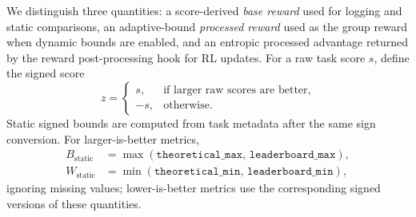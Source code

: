 We distinguish three quantities: a score-derived \emph{base reward} used for logging and static comparisons, an adaptive-bound \emph{processed reward} used as the group reward when dynamic bounds are enabled, and an entropic processed advantage returned by the reward post-processing hook for RL updates.
For a raw task score $s$, define the signed score
\begin{equation}
\label{eq:signscore}
z =
\begin{cases}
s, & \text{if larger raw scores are better},\\
-s, & \text{otherwise}.
\end{cases}
\end{equation}
Static signed bounds are computed from task metadata after the same sign conversion. For larger-is-better metrics,
\begin{equation}
\label{eq:metric}
\begin{aligned}
B_{\mathrm{static}} &= \max(\texttt{theoretical\_max},\, \texttt{leaderboard\_max}), \\
W_{\mathrm{static}} &= \min(\texttt{theoretical\_min},\, \texttt{leaderboard\_min}),
\end{aligned}
\end{equation}
ignoring missing values; lower-is-better metrics use the corresponding signed versions of these quantities.

